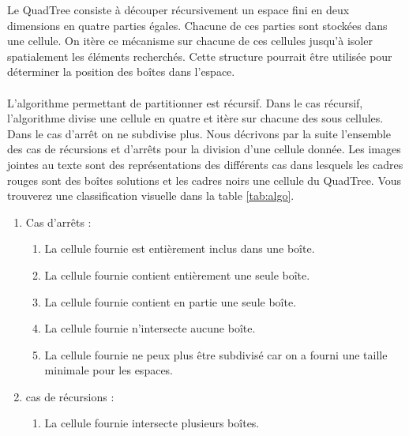Le QuadTree consiste à découper récursivement un espace fini en deux dimensions en quatre parties égales. Chacune de ces parties sont stockées dans une cellule. On itère ce mécanisme sur chacune de ces cellules jusqu'à isoler spatialement les éléments recherchés.
Cette structure pourrait être utilisée pour déterminer la position des boîtes dans l'espace.

\paragraph{}L'algorithme permettant de partitionner est récursif. Dans le cas récursif, l'algorithme divise une cellule en quatre et itère sur chacune des sous cellules. Dans le cas d'arrêt on ne subdivise plus. Nous décrivons par la suite l'ensemble des cas de récursions et d'arrêts pour la division d'une cellule donnée. Les images jointes au texte sont des représentations des différents cas dans lesquels les cadres rouges sont des boîtes solutions et les cadres noirs une cellule du QuadTree. Vous trouverez une classification visuelle dans la table \ref{tab:algo}.
\begin{enumerate}
\item Cas d'arrêts : 
\begin{enumerate}
\item La cellule fournie est entièrement inclus dans une boîte.
\label{enu:quad1}
\item La cellule fournie contient entièrement une seule boîte.
\label{enu:quad2}
\item La cellule fournie contient en partie une seule boîte.
\label{enu:quad3}
\item La cellule fournie n'intersecte aucune boîte.
\label{enu:quad4}
\item La cellule fournie ne peux plus être subdivisé car on a fourni une taille minimale pour les espaces.
\end{enumerate}
\item cas de récursions :
\begin{enumerate}
\item La cellule fournie intersecte plusieurs boîtes.
\label{enu:quad5}
\end{enumerate}
\end{enumerate}

